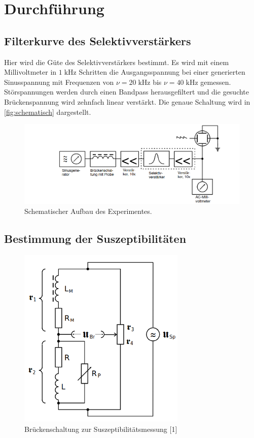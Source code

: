 \section{Durchführung}
\label{sec:Durchführung}

\subsection{Filterkurve des Selektivverstärkers}


Hier wird die Güte des Selektivverstärkers bestimmt. Es wird mit einem Millivoltmeter
in $1 \;\mathrm{kHz}$
Schritten die Ausgangsspannung bei einer generierten Sinusspannung mit Frequenzen 
von $\nu = 20 \; \mathrm{kHz}$ bis $\nu = 40 \; \mathrm{kHz}$ gemessen. \\
Störspannungen werden durch einen Bandpass herausgefiltert
und die gesuchte Brückenspannung wird zehnfach linear verstärkt. Die genaue Schaltung wird in \autoref{fig:schematisch} dargestellt.\\
\begin{figure}
    \centering
    \includegraphics[width=\textwidth]{content/Aufbau.png}
    \caption{Schematischer Aufbau des Experimentes.\cite{sample}}
    \label{fig:schematisch}
\end{figure}


\subsection{Bestimmung der Suszeptibilitäten}

\begin{figure} [H]
    \centering
    \includegraphics[width=8cm]{content/bild1.png}
    \caption{Brückenschaltung zur Suszeptibilitätsmessung [1]}
    \label{fig:plot1}
  \end{figure}

